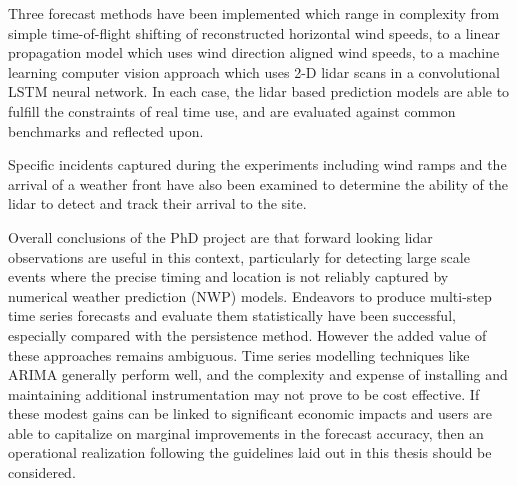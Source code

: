 Three forecast methods have been implemented which range in complexity from simple time-of-flight shifting of reconstructed horizontal wind speeds, to a linear propagation model which uses wind direction aligned wind speeds, to a machine learning computer vision approach which uses 2-D lidar scans in a convolutional LSTM neural network. In each case, the lidar based prediction models are able to fulfill the constraints of real time use, and are evaluated against common benchmarks and reflected upon.

Specific incidents captured during the experiments including wind ramps and the arrival of a weather front have also been examined to determine the ability of the lidar to detect and track their arrival to the site. 

Overall conclusions of the PhD project are that forward looking lidar observations are useful in this context, particularly for detecting large scale events where the precise timing and location is not reliably captured by numerical weather prediction (NWP) models. Endeavors to produce multi-step time series forecasts and evaluate them statistically have been successful, especially compared with the persistence method. However the added value of these approaches remains ambiguous. Time series modelling techniques like ARIMA generally perform well, and the complexity and expense of installing and maintaining additional instrumentation may not prove to be cost effective. If these modest gains can be linked to significant economic impacts and users are able to capitalize on marginal improvements in the forecast accuracy, then an operational realization following the guidelines laid out in this thesis should be considered.